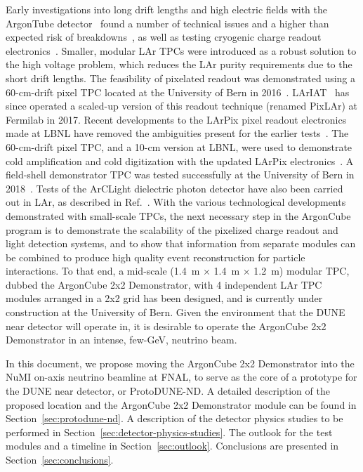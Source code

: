 Early investigations into long drift lengths and high electric fields with the ArgonTube detector~\cite{argontube_design} found a number of technical issues and a higher than expected risk of breakdowns~\cite{argontube}, as well as testing cryogenic charge readout electronics~\cite{art_cold_ero}. Smaller, modular LAr TPCs were introduced as a robust solution to the high voltage problem, which reduces the LAr purity requirements due to the short drift lengths. The feasibility of pixelated readout was demonstrated using a 60-cm-drift pixel TPC located at the University of Bern in 2016~\cite{pixels}. LArIAT~\cite{lariat} has since operated a scaled-up version of this readout technique (renamed PixLAr) at Fermilab in 2017. Recent developments to the LArPix pixel readout electronics made at LBNL have removed the ambiguities present for the earlier tests~\cite{larpix}. The 60-cm-drift pixel TPC, and a 10-cm version at LBNL, were used to demonstrate cold amplification and cold digitization with the updated LArPix electronics~\cite{larpix}. A field-shell demonstrator TPC was tested successfully at the University of Bern in 2018~\cite{argoncube_fd}. Tests of the ArCLight dielectric photon detector have also been carried out in LAr, as described in Ref.~\cite{arclight}. With the various technological developments demonstrated with small-scale TPCs, the next necessary step in the ArgonCube program is to demonstrate the scalability of the pixelized charge readout and light detection systems, and to show that information from separate modules can be combined to produce high quality event reconstruction for particle interactions. To that end, a mid-scale (1.4~m $\times$ 1.4~m $\times$ 1.2~m) modular TPC, dubbed the ArgonCube 2x2 Demonstrator, with 4 independent LAr TPC modules arranged in a 2x2 grid has been designed, and is currently under construction at the University of Bern. Given the environment that the DUNE near detector will operate in, it is desirable to operate the ArgonCube 2x2 Demonstrator in an intense, few-GeV, neutrino beam.

In this document, we propose moving the ArgonCube 2x2 Demonstrator into the NuMI on-axis neutrino beamline at FNAL, to serve as the core of a prototype for the DUNE near detector, or ProtoDUNE-ND. A detailed description of the proposed location and the ArgonCube 2x2 Demonstrator module can be found in Section~\ref{sec:protodune-nd}. A description of the detector physics studies to be performed in Section~\ref{sec:detector-physics-studies}. The outlook for the test modules and a timeline in Section~\ref{sec:outlook}. Conclusions are presented in Section~\ref{sec:conclusions}.\\\\

